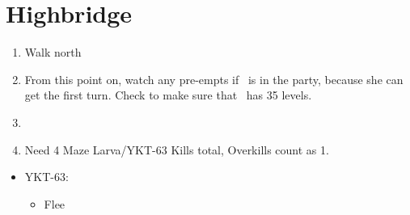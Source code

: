 \chapter{Highbridge}
\begin{spheregrid}
	\begin{itemize}
		\yunaf
	\end{itemize}
\end{spheregrid}
\begin{enumerate}
	\item Walk north
	\item From this point on, watch any pre-empts if \yuna\ is in the party, because she can get the first turn. Check to make sure that \lulu\ has 35 levels.
	\item \formation{\tidus}{\yuna}{\wakka}
	\item Need 4 Maze Larva/YKT-63 Kills total, Overkills count as 1.
\end{enumerate}
\bothvfill
\winvfill
\begin{encounters}
	\begin{itemize}
		\item YKT-63:
		      \begin{itemize}
			      \tidusf Attack
			      \yunaf Attack
			      \item Flee
		      \end{itemize}
	\end{itemize}
\end{encounters}
